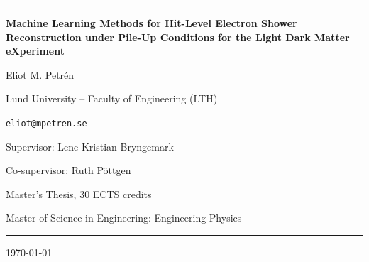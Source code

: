 




\begin{titlepage}
\begin{center}
  \noindent\rule{\textwidth}{4pt}
  \vspace{0.20in}

  {\LARGE \bfseries Machine Learning Methods for Hit-Level Electron Shower Reconstruction under Pile-Up Conditions for the Light Dark Matter eXperiment \par}
  \vspace{0.7em}







  {\large Eliot M. Petrén\par}
  \vspace{0.35em}
  {\normalsize Lund University -- Faculty of Engineering (LTH)\par}
  \vspace{0.2em}
  {\normalsize \texttt{eliot@mpetren.se}\par}
  \vspace{0.45em}
  {\normalsize Supervisor: Lene Kristian Bryngemark\par}
  {\normalsize Co-supervisor: Ruth Pöttgen\par}

  \vspace{0.7em}
  {\normalsize Master's Thesis, 30 ECTS credits\par}
  {\normalsize Master of Science in Engineering: Engineering Physics\par}

  \vspace{0.18in}
  \noindent\rule{\textwidth}{1pt}
\end{center}

\vspace{0.35in}

\begin{abstract}

\end{abstract}

\vfill

\begin{center}
  \today
\end{center}
\end{titlepage}


